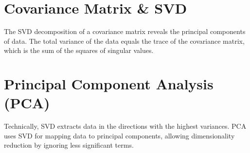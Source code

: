 \documentclass{ximera}
\begin{document}
\section{Covariance Matrix \& SVD}
The SVD decomposition of a covariance matrix reveals the principal components of data. The total variance of the data equals the trace of the covariance matrix, which is the sum of the squares of singular values.

\section{Principal Component Analysis (PCA)}
Technically, SVD extracts data in the directions with the highest variances. PCA uses SVD for mapping data to principal components, allowing dimensionality reduction by ignoring less significant terms.
\end{document}
